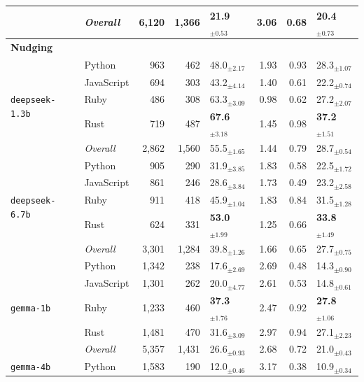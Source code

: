 \begin{longtable}{@{}llrrp{0.72cm}rrp{0.72cm}@{}}
      & \textit{Overall} & 6,120 & 1,366 & 21.9$_{\pm 0.53}$ & 3.06 & 0.68 & 20.4$_{\pm 0.73}$ \\
  \midrule[1.2pt]
  \multicolumn{8}{l}{\textbf{\small Nudging}} \\
  \midrule
      \multirow{5}{*}{\texttt{deepseek-1.3b}} & Python & 963 & 462 & 48.0$_{\pm 2.17}$ & 1.93 & 0.93 & 28.3$_{\pm 1.07}$ \\
       & JavaScript & 694 & 303 & 43.2$_{\pm 4.14}$ & 1.40 & 0.61 & 22.2$_{\pm 0.74}$ \\
       & Ruby & 486 & 308 & 63.3$_{\pm 3.09}$ & 0.98 & 0.62 & 27.2$_{\pm 2.07}$ \\
       & Rust & 719 & 487 & \textbf{67.6$_{\pm 3.18}$} & 1.45 & 0.98 & \textbf{37.2$_{\pm 1.51}$} \\ \cmidrule(lr){2-8}
      & \textit{Overall} & 2,862 & 1,560 & 55.5$_{\pm 1.65}$ & 1.44 & 0.79 & 28.7$_{\pm 0.54}$ \\
    \midrule
      \multirow{5}{*}{\texttt{deepseek-6.7b}} & Python & 905 & 290 & 31.9$_{\pm 3.85}$ & 1.83 & 0.58 & 22.5$_{\pm 1.72}$ \\
       & JavaScript & 861 & 246 & 28.6$_{\pm 3.84}$ & 1.73 & 0.49 & 23.2$_{\pm 2.58}$ \\
       & Ruby & 911 & 418 & 45.9$_{\pm 1.04}$ & 1.83 & 0.84 & 31.5$_{\pm 1.28}$ \\
       & Rust & 624 & 331 & \textbf{53.0$_{\pm 1.99}$} & 1.25 & 0.66 & \textbf{33.8$_{\pm 1.49}$} \\ \cmidrule(lr){2-8}
      & \textit{Overall} & 3,301 & 1,284 & 39.8$_{\pm 1.26}$ & 1.66 & 0.65 & 27.7$_{\pm 0.75}$ \\
    \midrule
      \multirow{5}{*}{\texttt{gemma-1b}} & Python & 1,342 & 238 & 17.6$_{\pm 2.69}$ & 2.69 & 0.48 & 14.3$_{\pm 0.90}$ \\
       & JavaScript & 1,301 & 262 & 20.0$_{\pm 4.77}$ & 2.61 & 0.53 & 14.8$_{\pm 0.61}$ \\
       & Ruby & 1,233 & 460 & \textbf{37.3$_{\pm 1.76}$} & 2.47 & 0.92 & \textbf{27.8$_{\pm 1.06}$} \\
       & Rust & 1,481 & 470 & 31.6$_{\pm 3.09}$ & 2.97 & 0.94 & 27.1$_{\pm 2.23}$ \\ \cmidrule(lr){2-8}
      & \textit{Overall} & 5,357 & 1,431 & 26.6$_{\pm 0.93}$ & 2.68 & 0.72 & 21.0$_{\pm 0.43}$ \\
    \midrule
      \multirow{5}{*}{\texttt{gemma-4b}} & Python & 1,583 & 190 & 12.0$_{\pm 0.46}$ & 3.17 & 0.38 & 10.9$_{\pm 0.34}$ \\

\end{longtable}
